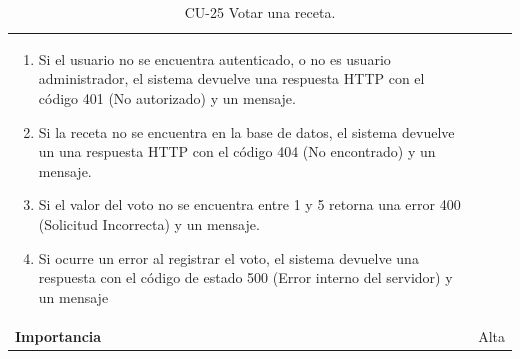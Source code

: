 \begin{table}[p]
\begin{tabularx}{\linewidth}{ p{} p{} }
\begin{enumerate}
			\def\labelenumi{\arabic{enumi}.}
			\tightlist
   			\item Si el usuario no se encuentra autenticado, o no es usuario administrador, el sistema devuelve una                 respuesta HTTP con el código 401 (No autorizado) y un mensaje.
                \item   Si la receta no se encuentra en la base de datos, el sistema devuelve un                           una respuesta HTTP con el código 404 (No encontrado) y un mensaje. 
                \item   Si el valor del voto no se encuentra entre 1 y 5 retorna una error 400 (Solicitud Incorrecta) y un mensaje. 
                \item Si ocurre un error al registrar el voto, el sistema devuelve una respuesta con el código de estado 500 (Error interno del servidor) y un mensaje
            \end{enumerate}\\
		\textbf{Importancia}          & Alta \\
		\bottomrule
	\end{tabularx}
	\caption{CU-25 Votar una receta.}
\end{table}

